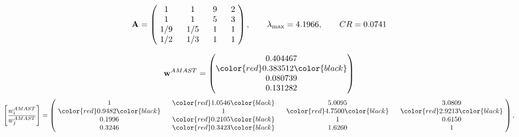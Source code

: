 \begin{example}
\begin{equation*}
\mathbf{A} =
\begin{pmatrix}
$\,\,$ 1 $\,\,$ & $\,\,$1$\,\,$ & $\,\,$9$\,\,$ & $\,\,$2 $\,\,$ \\
$\,\,$ 1 $\,\,$ & $\,\,$ 1 $\,\,$ & $\,\,$5$\,\,$ & $\,\,$3 $\,\,$ \\
$\,\,$ 1/9$\,\,$ & $\,\,$ 1/5$\,\,$ & $\,\,$ 1 $\,\,$ & $\,\,$1 $\,\,$ \\
$\,\,$ 1/2$\,\,$ & $\,\,$ 1/3$\,\,$ & $\,\,$ 1 $\,\,$ & $\,\,$ 1  $\,\,$ \\
\end{pmatrix},
\qquad
\lambda_{\max} =
4.1966,
\qquad
CR = 0.0741
\end{equation*}

\begin{equation*}
\mathbf{w}^{AMAST} =
\begin{pmatrix}
0.404467\\
\color{red} 0.383512\color{black} \\
0.080739\\
0.131282
\end{pmatrix}\end{equation*}
\begin{equation*}
\left[ \frac{{w}^{AMAST}_i}{{w}^{AMAST}_j} \right] =
\begin{pmatrix}
$\,\,$ 1 $\,\,$ & $\,\,$\color{red} 1.0546\color{black} $\,\,$ & $\,\,$5.0095$\,\,$ & $\,\,$3.0809$\,\,$ \\
$\,\,$\color{red} 0.9482\color{black} $\,\,$ & $\,\,$ 1 $\,\,$ & $\,\,$\color{red} 4.7500\color{black} $\,\,$ & $\,\,$\color{red} 2.9213\color{black}   $\,\,$ \\
$\,\,$0.1996$\,\,$ & $\,\,$\color{red} 0.2105\color{black} $\,\,$ & $\,\,$ 1 $\,\,$ & $\,\,$0.6150 $\,\,$ \\
$\,\,$0.3246$\,\,$ & $\,\,$\color{red} 0.3423\color{black} $\,\,$ & $\,\,$1.6260$\,\,$ & $\,\,$ 1  $\,\,$ \\
\end{pmatrix},
\end{equation*}


\end{example}
